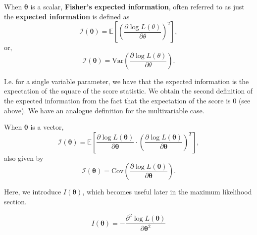 \begin{definition}\label{defn:expected information - single}
    When \(\bm{\theta}\) is a scalar, \textbf{Fisher's expected information}, often referred to as just the \textbf{expected information} is defined as 
    \begin{equation}\label{eq:expected info sing E score}
        \mathscr{I}(\bm{\theta}) = \mathbb{E}\left[\left(\frac{\partial \log L(\theta)}{\partial \theta}\right)^2\right],
    \end{equation}
    or, 
    \begin{equation}\label{eq:expected info sing Var score}
        \mathscr{I}(\bm{\theta}) = \text{Var}\left(\frac{\partial \log L(\theta)}{\partial \theta}\right).
    \end{equation}
\end{definition}

I.e. for a single variable parameter, we have that the expected information is the expectation of the square of the score statistic. 
We obtain the second definition of the expected information from the fact that the expectation of the score is \(0\) (see above). 
We have an analogue definition for the multivariable case. 

\begin{definition}\label{defn:expected information - multi}
    When \(\bm{\theta}\) is a vector,  
    \begin{equation}\label{eq:expected info multi E score}
        \mathscr{I}(\bm{\theta}) = \mathbb{E}\left[\frac{\partial \log L(\bm{\theta})}{\partial \bm{\theta}} \cdot \left(\frac{\partial \log L(\bm{\theta})}{\partial \bm{\theta}}\right)^T\right],
    \end{equation}
    also given by 
    \begin{equation}\label{eq:expected info multi Cov score}
        \mathscr{I}(\bm{\theta}) = \text{Cov}\left(\frac{\partial \log L(\bm{\theta})}{\partial \bm{\theta}}\right).
    \end{equation}
\end{definition}

Here, we introduce \(I(\bm{\theta})\), which becomes useful later in the maximum likelihood section.

\begin{equation}\label{eq:I}
    I(\bm{\theta}) = -\frac{\partial^2 \log L(\bm{\theta})}{\partial \bm{\theta}^2}
\end{equation}

